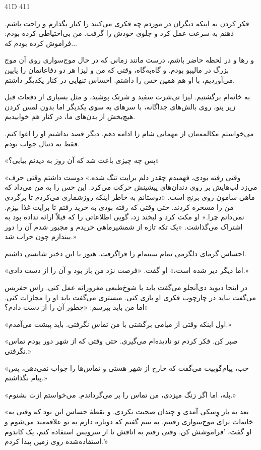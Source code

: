 41D 411

فکر کردن به اینکه دیگران در موردم چه فکری می‌کنند را کنار بگذارم و راحت باشم. ذهنم به سرعت عمل کرد و جلوی خودش را گرفت. من بی‌احتیاطی کرده‌ بودم: فراموش کرده‌ بودم که...

و رها و در لحظه حاضر باشم، درست مانند زمانی که در حال موج‌سواری روی آن موج بزرگ در مالیبو بودم. و گاه‌به‌گاه، وقتی که من و لیزا هر دو دفاعاتمان را پایین می‌آوردیم، با او هم همین حس را داشتم. احساس تنهایی در کنار یکدیگر داشتم. 

به خانه‌ام برگشتیم. لیزا تی‌شرت سفید و شرتک پوشید، و مثل بسیاری از دفعات قبل زیر پتو، روی بالش‌های جداگانه، با سرهای به سوی یکدیگر اما بدون لمس کردن هیچ‌بخش از بدن‌های ما، در کنار هم خوابیدیم.

می‌خواستم مکالمه‌مان از مهمانی شام را ادامه دهم. دیگر قصد نداشتم او را اغوا کنم. فقط به دنبال جواب بودم. 

«پس چه چیزی باعث شد که آن روز به دیدنم بیایی؟»

«وقتی رفته بودی، فهمیدم چقدر دلم برایت تنگ شده.» دوست داشتم وقتی حرف می‌زد لب‌هایش بر روی دندان‌های پیشینش حرکت می‌کرد. این حس را به من می‌داد که ماهی سامون روی برنج است. «دوستانم به خاطر اینکه روزشماری می‌کردم تا برگردی من را مسخره کردند. حتی وقتی که رفته بودی به خرید رفتم تا برایت غذا بپزم. نمی‌دانم چرا.» او مکث کرد و لبخند زد، گویی اطلاعاتی را که قبلاً ارائه نداده بود به اشتراک می‌گذاشت. «یک تکه تازه از شمشیرماهی خریدم و مجبور شدم آن را دور بیندازم چون خراب شد.»

احساس گرمای دلگرمی تمام سینه‌ام را فراگرفت. هنوز با این دختر شانسی داشتم.

«اما دیگر دیر شده است،» او گفت. «فرصت نزد من باز بود و آن را از دست دادی.»

در اینجا دیوید دی‌آنجلو می‌گفت باید با شوخ‌طبعی مغرورانه عمل کنی. راس جفریس می‌گفت نباید در چارچوب فکری او بازی کنی. میستری می‌گفت باید او را مجازات کنی. اما من باید بپرسم: «چطور آن را از دست دادم؟»

«اول اینکه وقتی از میامی برگشتی با من تماس نگرفتی. باید پیشت می‌آمدم.»

«صبر کن. فکر کردم تو نادیده‌ام می‌گیری. حتی وقتی که از شهر دور بودم تماس نگرفتی.»

«خب، پیام‌گوییت می‌گفت که خارج از شهر هستی و تماس‌ها را جواب نمی‌دهی، پس پیام نگذاشتم.»

«بله، اما اگر زنگ میزدی، من تماس را بر می‌گرداندم. می‌خواستم ازت بشنوم.»

«بعد به بار وِسکی آمدی و چندان صحبت نکردی. و نقطۀ حساس این بود که وقتی به خانه‌ات برای موج‌سواری رفتیم. به سم گفتم که دوباره دارم به تو علاقه‌مند می‌شوم و او گفت، 'فراموشش کن. وقتی رفتم به اتاقش تا از سرویس استفاده کنم، یک کاندوم استفاده‌شده روی زمین پیدا کردم.'»

